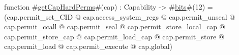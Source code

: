function #\hyperref[sailMIPSzgetCapHardPerms]{getCapHardPerms}#(cap) : Capability -> #\hyperref[sailMIPSzbits]{bits}#(12) =
   (cap.permit_set_CID
  @ cap.access_system_regs
  @ cap.permit_unseal
  @ cap.permit_ccall
  @ cap.permit_seal
  @ cap.permit_store_local_cap
  @ cap.permit_store_cap
  @ cap.permit_load_cap
  @ cap.permit_store
  @ cap.permit_load
  @ cap.permit_execute
  @ cap.global)
